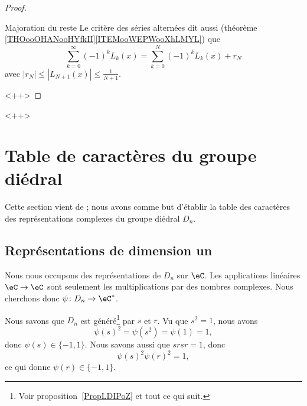 \begin{proof}
\begin{subproof}
        \item[Majoration du reste]
            Le critère des séries alternées dit aussi (théorème \ref{THOooOHANooHYfkII}\ref{ITEMooWEPWooXhLMYL}) que
            \begin{equation}
                \sum_{k=0}^{\infty}(-1)^kL_k(x)=\sum_{k=0}^N(-1)^kL_k(x)+r_N
            \end{equation}
            avec \(  | r_N |\leq | L_{N+1}(x) |\leq \frac{1}{ N+1 }  \).

    \end{subproof}
    <++>
    
\end{proof}
<++>

\section{Table de caractères du groupe diédral}
\label{SecWMzheKf}
Cette section vient de \cite{KXjFWKA}; nous avons comme but d'établir la table des caractères des représentations complexes du groupe diédral \( D_n\).

\subsection{Représentations de dimension un}

Nous nous occupons des représentations de \( D_n\) sur \( \eC\). Les applications linéaires \( \eC\to \eC\) sont seulement les multiplications par des nombres complexes. Nous cherchons donc \( \psi\colon D_n\to \eC^*\).

Nous savons que \( D_n\) est généré\footnote{Voir proposition~\ref{PropLDIPoZ} et tout ce qui suit.} par \( s\) et \( r\). Vu que \( s^2=1\), nous avons
\begin{equation}
    \psi(s)^2=\psi(s^2)=\psi(1)=1,
\end{equation}
donc \( \psi(s)\in\{ -1,1 \}\). Nous savons aussi que \( srsr=1\), donc
\begin{equation}
    \psi(s)^2\psi(r)^2=1,
\end{equation}
ce qui donne \( \psi(r)\in\{ -1,1 \}\).

